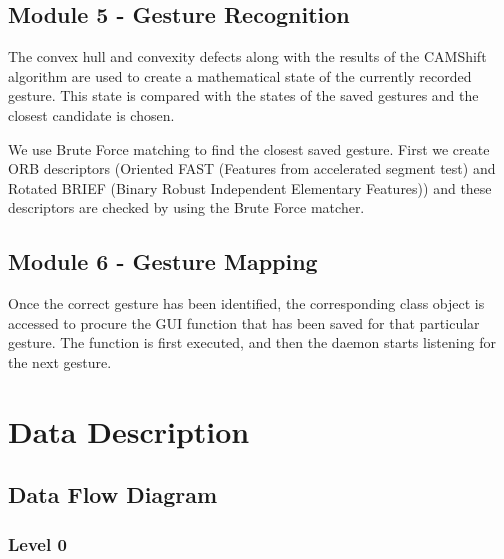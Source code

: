 \documentclass{scrreprt}
\begin{document}
\section{Module 5 - Gesture Recognition}
The convex hull and convexity defects along with the results of the CAMShift algorithm are 
used to create a mathematical state of the currently recorded gesture. This state is compared 
with the states of the saved gestures and the closest candidate is chosen.

We use Brute Force matching to find the closest saved gesture. First we create 
ORB descriptors (Oriented FAST (Features from accelerated segment test) and Rotated BRIEF 
(Binary Robust Independent Elementary Features)) and these descriptors are checked by using the 
Brute Force matcher.  

\section{Module 6 - Gesture Mapping}

Once the correct gesture has been identified, 
the corresponding class object is accessed to procure the GUI function that has been saved 
for that particular gesture. The function is first executed, and then the daemon starts listening 
for the next gesture.

\chapter{Data Description}

\section{Data Flow Diagram}

\subsection{Level 0}
\\
\end{document}

